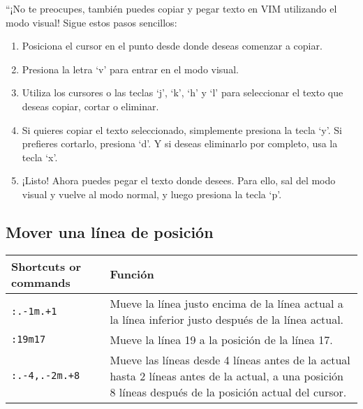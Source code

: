 \documentclass[
  doc,
  floatsintext,
  longtable,
  a4paper,
  nolmodern,
  notxfonts,
  notimes,
  colorlinks=true,linkcolor=blue,citecolor=blue,urlcolor=blue]{apa7}
\providecommand{\tightlist}{%
  \setlength{\itemsep}{0pt}\setlength{\parskip}{0pt}}
\begin{document}
``¡No te preocupes, también puedes copiar y pegar texto en VIM
utilizando el modo visual! Sigue estos pasos sencillos:

\begin{enumerate}
\def\labelenumi{\arabic{enumi}.}
\tightlist
\item
  Posiciona el cursor en el punto desde donde deseas comenzar a copiar.
\item
  Presiona la letra `v' para entrar en el modo visual.
\item
  Utiliza los cursores o las teclas `j', `k', `h' y `l' para seleccionar
  el texto que deseas copiar, cortar o eliminar.
\item
  Si quieres copiar el texto seleccionado, simplemente presiona la tecla
  `y'. Si prefieres cortarlo, presiona `d'. Y si deseas eliminarlo por
  completo, usa la tecla `x'.
\item
  ¡Listo! Ahora puedes pegar el texto donde desees. Para ello, sal del
  modo visual y vuelve al modo normal, y luego presiona la tecla `p'.
\end{enumerate}

\subsection{Mover una línea de
posición}\label{mover-una-luxednea-de-posiciuxf3n}

\begin{longtable}[]{@{}
  >{\raggedright\arraybackslash}p{}
  >{\raggedright\arraybackslash}p{}@{}}
\toprule\noalign{}
\begin{minipage}[b]{\linewidth}\raggedright
Shortcuts or commands
\end{minipage} & \begin{minipage}[b]{\linewidth}\raggedright
Función
\end{minipage} \\
\midrule\noalign{}
\endhead
\bottomrule\noalign{}
\endlastfoot
\texttt{:.-1m.+1} & Mueve la línea justo encima de la línea actual a la
línea inferior justo después de la línea actual. \\
\texttt{:19m17} & Mueve la línea 19 a la posición de la línea 17. \\
\texttt{:.-4,.-2m.+8} & Mueve las líneas desde 4 líneas antes de la
actual hasta 2 líneas antes de la actual, a una posición 8 líneas
después de la posición actual del cursor. \\
\end{longtable}
\end{document}
